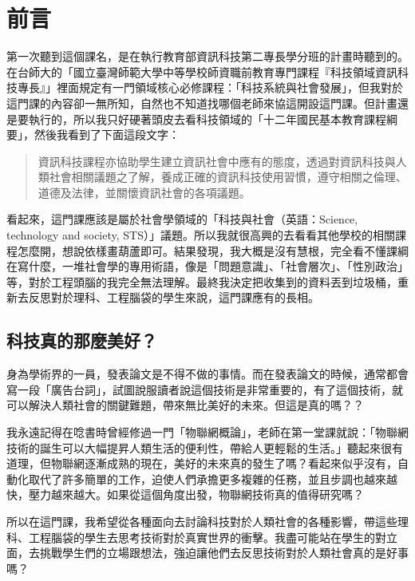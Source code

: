 \chapter*{前言}
\label{chap:forward}

第一次聽到這個課名，是在執行教育部資訊科技第二專長學分班的計畫時聽到的。在台師大的「國立臺灣師範大學中等學校師資職前教育專門課程『科技領域資訊科技專長』」裡面規定有一門領域核心必修課程：「科技系統與社會發展」，但我對於這門課的內容卻一無所知，自然也不知道找哪個老師來協這開設這門課。但計畫還是要執行的，所以我只好硬著頭皮去看科技領域的「十二年國民基本教育課程綱要」，然後我看到了下面這段文字：

\begin{quote}
資訊科技課程亦協助學生建立資訊社會中應有的態度，透過對資訊科技與人類社會相關議題之了解，養成正確的資訊科技使用習慣，遵守相關之倫理、道德及法律，並關懷資訊社會的各項議題。
\end{quote}

看起來，這門課應該是屬於社會學領域的「科技與社會（英語：Science, technology and society, STS）」議題。所以我就很高興的去看看其他學校的相關課程怎麼開，想說依樣畫葫蘆即可。結果發現，我大概是沒有慧根，完全看不懂課綱在寫什麼，一堆社會學的專用術語，像是「問題意識」、「社會層次」、「性別政治」等，對於工程頭腦的我完全無法理解。最終我決定把收集到的資料丟到垃圾桶，重新去反思對於理科、工程腦袋的學生來說，這門課應有的長相。

\section{科技真的那麼美好？}

身為學術界的一員，發表論文是不得不做的事情。而在發表論文的時候，通常都會寫一段「廣告台詞」，試圖說服讀者說這個技術是非常重要的，有了這個技術，就可以解決人類社會的關鍵難題，帶來無比美好的未來。但這是真的嗎？？

我永遠記得在唸書時曾經修過一門「物聯網概論」，老師在第一堂課就說：「物聯網技術的誕生可以大幅提昇人類生活的便利性，帶給人更輕鬆的生活。」聽起來很有道理，但物聯網逐漸成熟的現在，美好的未來真的發生了嗎？看起來似乎沒有，自動化取代了許多簡單的工作，迫使人們承擔更多複雜的任務，並且步調也越來越快，壓力越來越大。如果從這個角度出發，物聯網技術真的值得研究嗎？

所以在這門課，我希望從各種面向去討論科技對於人類社會的各種影響，帶這些理科、工程腦袋的學生去思考技術對於真實世界的衝擊。我盡可能站在學生的對立面，去挑戰學生們的立場跟想法，強迫讓他們去反思技術對於人類社會真的是好事嗎？

